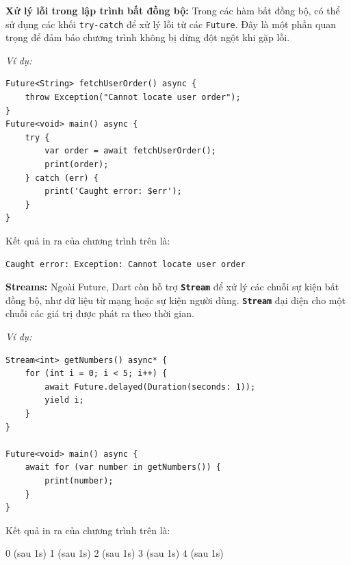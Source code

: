 \documentclass[../DoAn.tex]{subfiles}
\numberwithin{figure}{chapter}
\begin{document}
\textbf{Xử lý lỗi trong lập trình bất đồng bộ:}
Trong các hàm bất đồng bộ, có thể sử dụng các khối \texttt{try-catch} để xử lý lỗi từ các \texttt{Future}. Đây là một phần quan trọng để đảm bảo chương trình không bị dừng đột ngột khi gặp lỗi. 

\textit{Ví dụ:}
\begin{lstlisting}
Future<String> fetchUserOrder() async {
    throw Exception("Cannot locate user order");
}
Future<void> main() async {
    try {
        var order = await fetchUserOrder();
        print(order);
    } catch (err) {
        print('Caught error: $err');
    }
}
\end{lstlisting}

Kết quả in ra của chương trình trên là:
\begin{lstlisting}
Caught error: Exception: Cannot locate user order
\end{lstlisting}
\textbf{Streams:} Ngoài Future, Dart còn hỗ trợ \textbf{\texttt{Stream}} để xử lý các chuỗi sự kiện bất đồng bộ, như dữ liệu từ mạng hoặc sự kiện người dùng. \textbf{\texttt{Stream}} đại diện cho một chuỗi các giá trị được phát ra theo thời gian. 

\textit{Ví dụ:}
\begin{lstlisting}
Stream<int> getNumbers() async* {
    for (int i = 0; i < 5; i++) {
        await Future.delayed(Duration(seconds: 1));
        yield i;
    }
}

Future<void> main() async {
    await for (var number in getNumbers()) {
        print(number);
    }
}
\end{lstlisting}

Kết quả in ra của chương trình trên là:
\begin{myverbatim}
0 (sau 1s)
1 (sau 1s)
2 (sau 1s)
3 (sau 1s)
4 (sau 1s)
\end{myverbatim}
\end{document}
